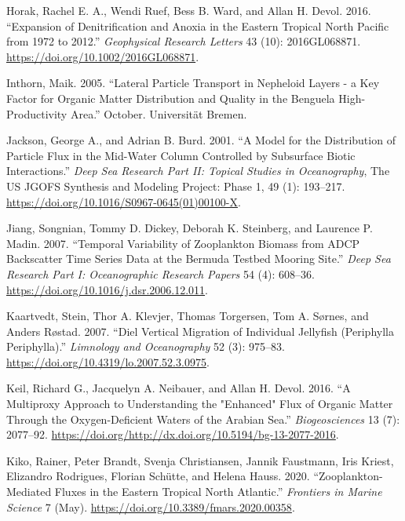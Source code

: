 \documentclass[]{article}
\begin{document}
\leavevmode\hypertarget{ref-horakExpansionDenitrificationAnoxia2016}{}%
Horak, Rachel E. A., Wendi Ruef, Bess B. Ward, and Allan H. Devol. 2016.
``Expansion of Denitrification and Anoxia in the Eastern Tropical North
Pacific from 1972 to 2012.'' \emph{Geophysical Research Letters} 43
(10): 2016GL068871. \url{https://doi.org/10.1002/2016GL068871}.

\leavevmode\hypertarget{ref-inthornLateralParticleTransport2005}{}%
Inthorn, Maik. 2005. ``Lateral Particle Transport in Nepheloid Layers -
a Key Factor for Organic Matter Distribution and Quality in the Benguela
High-Productivity Area.'' October. Universität Bremen.

\leavevmode\hypertarget{ref-jacksonModelDistributionParticle2001}{}%
Jackson, George A., and Adrian B. Burd. 2001. ``A Model for the
Distribution of Particle Flux in the Mid-Water Column Controlled by
Subsurface Biotic Interactions.'' \emph{Deep Sea Research Part II:
Topical Studies in Oceanography}, The US JGOFS Synthesis and Modeling
Project: Phase 1, 49 (1): 193--217.
\url{https://doi.org/10.1016/S0967-0645(01)00100-X}.

\leavevmode\hypertarget{ref-jiangTemporalVariabilityZooplankton2007}{}%
Jiang, Songnian, Tommy D. Dickey, Deborah K. Steinberg, and Laurence P.
Madin. 2007. ``Temporal Variability of Zooplankton Biomass from ADCP
Backscatter Time Series Data at the Bermuda Testbed Mooring Site.''
\emph{Deep Sea Research Part I: Oceanographic Research Papers} 54 (4):
608--36. \url{https://doi.org/10.1016/j.dsr.2006.12.011}.

\leavevmode\hypertarget{ref-kaartvedtDielVerticalMigration2007}{}%
Kaartvedt, Stein, Thor A. Klevjer, Thomas Torgersen, Tom A. Sørnes, and
Anders Røstad. 2007. ``Diel Vertical Migration of Individual Jellyfish
(Periphylla Periphylla).'' \emph{Limnology and Oceanography} 52 (3):
975--83. \url{https://doi.org/10.4319/lo.2007.52.3.0975}.

\leavevmode\hypertarget{ref-keilMultiproxyApproachUnderstanding2016}{}%
Keil, Richard G., Jacquelyn A. Neibauer, and Allan H. Devol. 2016. ``A
Multiproxy Approach to Understanding the "Enhanced" Flux of Organic
Matter Through the Oxygen-Deficient Waters of the Arabian Sea.''
\emph{Biogeosciences} 13 (7): 2077--92.
\url{https://doi.org/http://dx.doi.org/10.5194/bg-13-2077-2016}.

\leavevmode\hypertarget{ref-kikoZooplanktonMediatedFluxesEastern2020}{}%
Kiko, Rainer, Peter Brandt, Svenja Christiansen, Jannik Faustmann, Iris
Kriest, Elizandro Rodrigues, Florian Schütte, and Helena Hauss. 2020.
``Zooplankton-Mediated Fluxes in the Eastern Tropical North Atlantic.''
\emph{Frontiers in Marine Science} 7 (May).
\url{https://doi.org/10.3389/fmars.2020.00358}.
\end{document}
